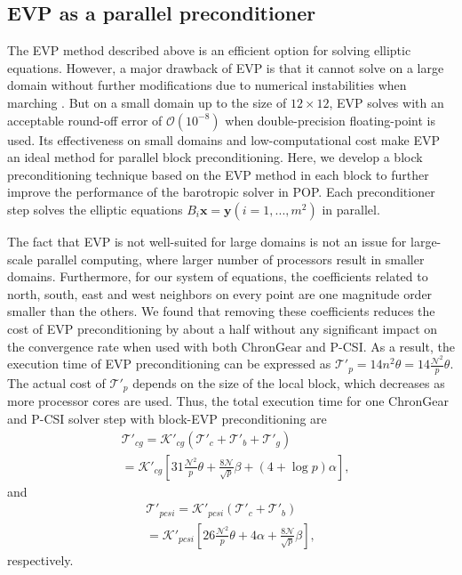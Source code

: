 

\subsection{EVP as a parallel preconditioner}
The EVP method described above is an efficient option for
solving elliptic equations.  However, a major drawback of
EVP is that it cannot solve on a large domain without further
modifications due to numerical instabilities when marching
\cite{roache1995elliptic}.  But on a small domain up to the size of
$12\times 12$, EVP solves with an acceptable round-off error of
$\mathcal{O}(10^{-8})$ when double-precision floating-point is used.  Its
effectiveness on small domains and low-computational cost make EVP an
ideal method for parallel block preconditioning.
Here, we develop a block preconditioning technique based on the EVP
method in each block to further improve the performance of the
barotropic solver in POP.  Each preconditioner step solves the
elliptic equations $B_i \textbf{x} = \textbf{y} (i=1,...,m^2)$ in
parallel.


The fact that EVP is not well-suited for large domains is not an issue for
large-scale parallel computing, where larger number of processors
result in smaller domains.  Furthermore, for our system of equations,
the coefficients related to north, south, east and west neighbors on
every point are one magnitude order smaller than the others. We found
that removing these coefficients reduces the cost of
EVP preconditioning by about a half without any significant
impact on the convergence rate when used with both ChronGear and
P-CSI.  As a result, the execution time of EVP preconditioning can be
expressed as $\mathcal{T'}_{p} = 14n^2\theta=
14\frac{\mathcal{N}^2}{p}\theta$.  The actual cost of
$\mathcal{T'}_{p}$ depends on the size of the local block, which
decreases as more processor cores are used.
Thus, the total execution time for one ChronGear and P-CSI solver step
with block-EVP preconditioning are
\begin{eqnarray}
\label{t_evppcg}
&\mathcal{T'}_{cg}=\mathcal{K'}_{cg} (\mathcal{T'}_c + \mathcal{T'}_b+\mathcal{T'}_g )\nonumber \\
&=\mathcal{K'}_{cg} [31 \frac{\mathcal{N}^2}{p}\theta + \frac{8\mathcal{N}}{\sqrt{p}}\beta +(4+\log p)\alpha],
\end{eqnarray}
and
\begin{eqnarray}
\label{t_evppsi}
\mathcal{T'}_{pcsi} = \mathcal{K'}_{pcsi}(\mathcal{T'}_c + \mathcal{T'}_b ) \nonumber \\
= \mathcal{K'}_{pcsi}[26\frac{\mathcal{N}^2}{p}\theta+ 4\alpha + \frac{8\mathcal{N}}{ \sqrt{p}}\beta],
\end{eqnarray}
respectively.

